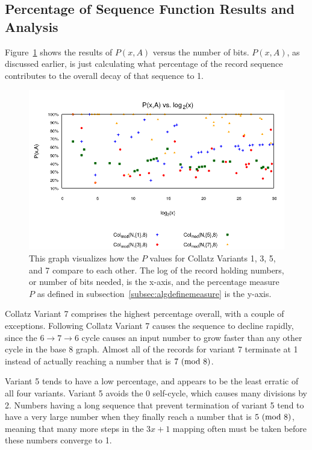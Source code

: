 \subsection{Percentage of Sequence Function Results and Analysis} \label{subsubsec:algsinpercentage}
 Figure~\ref{fig:pvslog} shows the results of $P(x,A)$ versus the number of bits. $P(x,A)$, as discussed earlier, is just calculating what percentage of the record sequence contributes to the overall decay of that sequence to 1. \par
\begin{figure}
    \centering
    \includegraphics[scale=0.6]{ModAvoidanceAnalysisPics/P_vs_log.png}
    \caption{This graph visualizes how the $P$ values for Collatz Variants 1, 3, 5, and 7 compare to each other. The log of the record holding numbers, or number of bits needed, is the x-axis, and the percentage measure $P$ as defined in subsection~\ref{subsec:algdefinemeasure} is the y-axis.}
    \label{fig:pvslog}
\end{figure}
Collatz Variant 7 comprises the highest percentage overall, with a couple of exceptions. Following Collatz Variant 7 causes the sequence to decline rapidly, since the $6 \rightarrow 7 \rightarrow 6$ cycle causes an input number to grow faster than any other cycle in the base 8 graph. Almost all of the records for variant 7 terminate at 1 instead of actually reaching a number that is $7 \ (\mathrm{mod}\ 8)$. \par
Variant 5 tends to have a low percentage, and appears to be the least erratic of all four variants. Variant 5 avoids the 0 self-cycle, which causes many divisions by 2. Numbers having a long sequence that prevent termination of variant 5 tend to have a very large number when they finally reach a number that is $5 \ (\mathrm{mod}\ 8)$, meaning that many more steps in the $3x+1$ mapping often must be taken before these numbers converge to 1. \par
